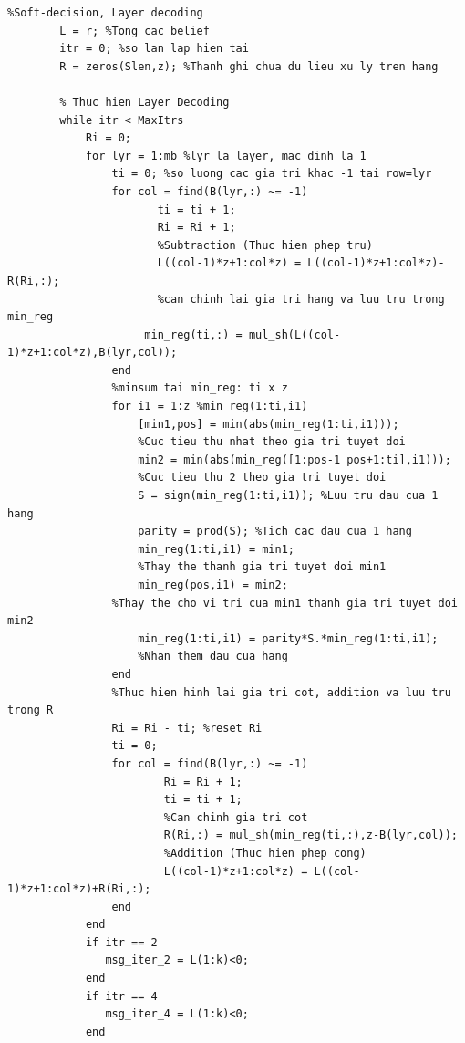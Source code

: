 \documentclass{article}
\begin{document}
\begin{tcolorbox}
\begin{verbatim}
%Soft-decision, Layer decoding
        L = r; %Tong cac belief
        itr = 0; %so lan lap hien tai
        R = zeros(Slen,z); %Thanh ghi chua du lieu xu ly tren hang
        
        % Thuc hien Layer Decoding
        while itr < MaxItrs
            Ri = 0;
            for lyr = 1:mb %lyr la layer, mac dinh la 1
                ti = 0; %so luong cac gia tri khac -1 tai row=lyr
                for col = find(B(lyr,:) ~= -1)
                       ti = ti + 1;
                       Ri = Ri + 1;
                       %Subtraction (Thuc hien phep tru)
                       L((col-1)*z+1:col*z) = L((col-1)*z+1:col*z)-R(Ri,:);
                       %can chinh lai gia tri hang va luu tru trong min_reg
                     min_reg(ti,:) = mul_sh(L((col-1)*z+1:col*z),B(lyr,col)); 
                end
                %minsum tai min_reg: ti x z
                for i1 = 1:z %min_reg(1:ti,i1)
                    [min1,pos] = min(abs(min_reg(1:ti,i1))); 
                    %Cuc tieu thu nhat theo gia tri tuyet doi
                    min2 = min(abs(min_reg([1:pos-1 pos+1:ti],i1))); 
                    %Cuc tieu thu 2 theo gia tri tuyet doi
                    S = sign(min_reg(1:ti,i1)); %Luu tru dau cua 1 hang
                    parity = prod(S); %Tich cac dau cua 1 hang
                    min_reg(1:ti,i1) = min1; 
                    %Thay the thanh gia tri tuyet doi min1
                    min_reg(pos,i1) = min2;
                %Thay the cho vi tri cua min1 thanh gia tri tuyet doi min2
                    min_reg(1:ti,i1) = parity*S.*min_reg(1:ti,i1); 
                    %Nhan them dau cua hang
                end
                %Thuc hien hinh lai gia tri cot, addition va luu tru trong R
                Ri = Ri - ti; %reset Ri
                ti = 0;
                for col = find(B(lyr,:) ~= -1)
                        Ri = Ri + 1;
                        ti = ti + 1;
                        %Can chinh gia tri cot
                        R(Ri,:) = mul_sh(min_reg(ti,:),z-B(lyr,col));
                        %Addition (Thuc hien phep cong)
                        L((col-1)*z+1:col*z) = L((col-1)*z+1:col*z)+R(Ri,:);
                end
            end      
            if itr == 2
               msg_iter_2 = L(1:k)<0;
            end
            if itr == 4
               msg_iter_4 = L(1:k)<0;
            end      
\end{verbatim}
\end{tcolorbox}
\end{document}
